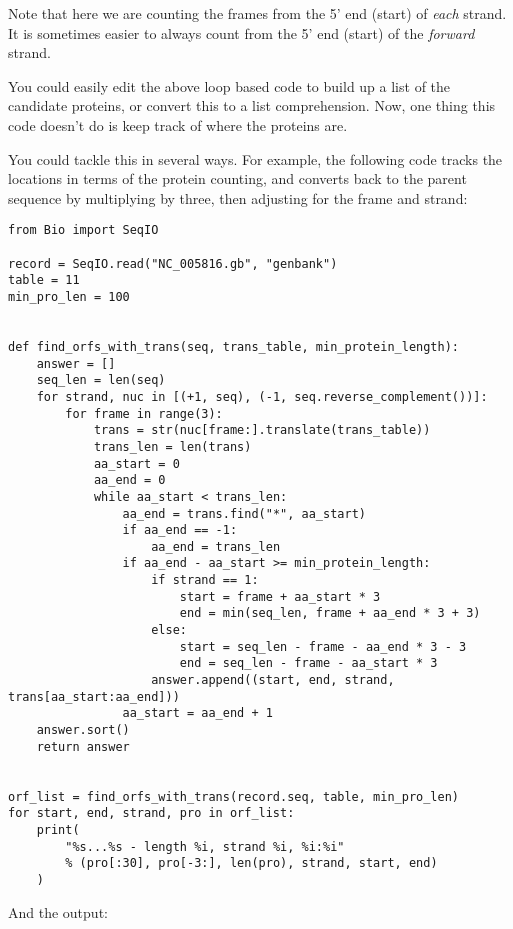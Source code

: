 Note that here we are counting the frames from the 5' end (start) of
\emph{each} strand. It is sometimes easier to always count from the 5' end
(start) of the \emph{forward} strand.

You could easily edit the above loop based code to build up a list of the
candidate proteins, or convert this to a list comprehension.  Now, one thing
this code doesn't do is keep track of where the proteins are.

You could tackle this in several ways.  For example, the following code tracks
the locations in terms of the protein counting, and converts back to the
parent sequence by multiplying by three, then adjusting for the frame and
strand:

\begin{verbatim}
from Bio import SeqIO

record = SeqIO.read("NC_005816.gb", "genbank")
table = 11
min_pro_len = 100


def find_orfs_with_trans(seq, trans_table, min_protein_length):
    answer = []
    seq_len = len(seq)
    for strand, nuc in [(+1, seq), (-1, seq.reverse_complement())]:
        for frame in range(3):
            trans = str(nuc[frame:].translate(trans_table))
            trans_len = len(trans)
            aa_start = 0
            aa_end = 0
            while aa_start < trans_len:
                aa_end = trans.find("*", aa_start)
                if aa_end == -1:
                    aa_end = trans_len
                if aa_end - aa_start >= min_protein_length:
                    if strand == 1:
                        start = frame + aa_start * 3
                        end = min(seq_len, frame + aa_end * 3 + 3)
                    else:
                        start = seq_len - frame - aa_end * 3 - 3
                        end = seq_len - frame - aa_start * 3
                    answer.append((start, end, strand, trans[aa_start:aa_end]))
                aa_start = aa_end + 1
    answer.sort()
    return answer


orf_list = find_orfs_with_trans(record.seq, table, min_pro_len)
for start, end, strand, pro in orf_list:
    print(
        "%s...%s - length %i, strand %i, %i:%i"
        % (pro[:30], pro[-3:], len(pro), strand, start, end)
    )
\end{verbatim}

\noindent And the output:

